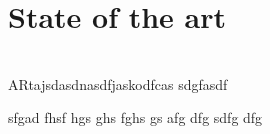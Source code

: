 
\chapter{State of the art}
\\
ARtajsdasdnasdfjaskodfcas
sdgfasdf

sfgad
fhsf
hgs
ghs
fghs
gs
afg
dfg
sdfg
dfg